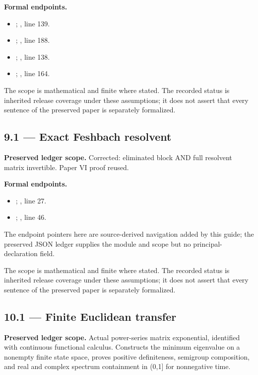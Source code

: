 \textbf{Formal endpoints.}\begin{itemize}
\item {}; , line 139.
\item {}; , line 188.
\item {}; , line 138.
\item {}; , line 164.
\end{itemize}
The scope is mathematical and finite where stated. The recorded status is inherited release coverage under these assumptions; it does not assert that every sentence of the preserved paper is separately formalized.

\subsection{9.1 — Exact Feshbach resolvent}
\label{result:9.1}
\textbf{Preserved ledger scope.} Corrected: eliminated block AND full resolvent matrix invertible. Paper VI proof reused.

\textbf{Formal endpoints.}\begin{itemize}
\item {}; , line 27.
\item {}; , line 46.
\end{itemize}
The endpoint pointers here are source-derived navigation added by this guide; the preserved JSON ledger supplies the module and scope but no principal-declaration field.

The scope is mathematical and finite where stated. The recorded status is inherited release coverage under these assumptions; it does not assert that every sentence of the preserved paper is separately formalized.

\subsection{10.1 — Finite Euclidean transfer}
\label{result:10.1}
\textbf{Preserved ledger scope.} Actual power-series matrix exponential, identified with continuous functional calculus. Constructs the minimum eigenvalue on a nonempty finite state space, proves positive definiteness, semigroup composition, and real and complex spectrum containment in (0,1] for nonnegative time.

